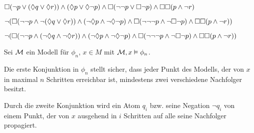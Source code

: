 \begin{center}
$ \Box(\neg p \vee (\lozenge q \vee \lozenge r)) \wedge (\lozenge p \vee \lozenge \neg p) \wedge
\Box (\neg \neg p \vee \Box \neg p) \wedge \Box \Box (p \wedge \neg r) $

$ \neg(\Box (\neg\neg p \wedge \neg(\lozenge q \vee \lozenge r)) \wedge (\neg\lozenge p
\wedge \neg\lozenge\neg p) \wedge \Box (\neg\neg\neg p \wedge \neg\Box\neg p) \wedge \Box\Box (p \wedge \neg r)) $

$ \neg(\Box (\neg\neg p \wedge (\neg\lozenge q \wedge \neg\lozenge r)) \wedge (\neg\lozenge p
\wedge \neg\lozenge\neg p) \wedge \Box (\neg\neg\neg p \wedge \neg\Box\neg p) \wedge \Box\Box (p \wedge \neg r)) $
\end{center}







Sei $\mathcal{M}$ ein Modell für $\phi_n$, $x\in M$ mit $\mathcal{M}, x \vDash
\phi_n$.

Die erste Konjunktion in $\phi_n$ stellt sicher, dass jeder Punkt des
Modells, der von $x$ in maximal $n$ Schritten erreichbar ist, mindestens zwei
verschiedene Nachfolger besitzt.

Durch die zweite Konjunktion wird ein Atom $q_i$ bzw. seine Negation $\neg q_i$
von einem Punkt, der von $x$ ausgehend in $i$ Schritten auf alle seine Nachfolger propagiert.


